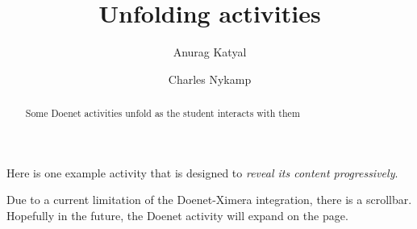 \documentclass{ximera}
\title{Unfolding activities}
\author{Anurag Katyal \and Charles Nykamp}
\begin{document}
\begin{abstract}
  Some Doenet activities unfold as the student interacts with them
\end{abstract}
\maketitle
\label{xim:doenetDemo}


Here is one example activity that is designed to \textit{reveal its content progressively}.


Due to a current limitation of the Doenet-Ximera integration, there is a scrollbar. Hopefully in the future, the Doenet activity will expand on the page.
\end{document}
